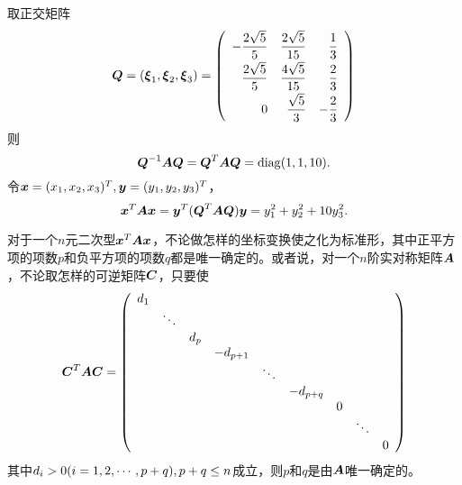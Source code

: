 \begin{frame}
  
  取正交矩阵
  $$
  \boldsymbol{Q}=(\boldsymbol{\xi}_1,\boldsymbol{\xi}_2,\boldsymbol{\xi}_3)=\left(
    \begin{array}{rrr}
      \displaystyle-\frac{2\sqrt{5}}5&\displaystyle\frac{2\sqrt{5}}{15}&\displaystyle\frac13\\[0.2cm]
      \displaystyle \frac{2\sqrt{5}}5&\displaystyle\frac{4\sqrt{5}}{15}&\displaystyle\frac23\\[0.2cm]
      \displaystyle 0&\displaystyle\frac{\sqrt{5}}3&\displaystyle-\frac23
    \end{array}
  \right)
  $$
  则
  $$
  \boldsymbol{Q}^{-1}\boldsymbol{A}\boldsymbol{Q}=\boldsymbol{Q}^{T}\boldsymbol{A}\boldsymbol{Q}=\mathrm{diag}(1,1,10).
  $$ \pause 
  令${\boldsymbol{x}}=(x_1,x_2,x_3)^T,{\boldsymbol{y}}=(y_1,y_2,y_3)^T$，
  $$
  {\boldsymbol{x}}^T\boldsymbol{A}{\boldsymbol{x}}={\boldsymbol{y}}^T(\boldsymbol{Q}^T\boldsymbol{A}\boldsymbol{Q}){\boldsymbol{y}}=y_1^2+y_2^2+10y_3^2.
  $$
  
\end{frame}








\begin{frame}
  
  \begin{dingli}[惯性定理]
    对于一个$n$元二次型${\boldsymbol{x}}^T\boldsymbol{A}{\boldsymbol{x}}$，不论做怎样的坐标变换使之化为标准形，其中正平方项的项数$p$和负平方项的项数$q$都是唯一确定的。或者说，对一个$n$阶实对称矩阵$\boldsymbol{A}$，不论取怎样的可逆矩阵$\boldsymbol{C}$，只要使
    $$
    \boldsymbol{C}^T\boldsymbol{A}\boldsymbol{C}=\left(
      \begin{array}{cccccccccc}
        d_1&&&&&&&&\\
           &\ddots&&&&&&&\\
           &&d_p&&&&&&\\
           &&&-d_{p+1}&&&&&\\
           &&&&\ddots&&&&\\
           &&&&&-d_{p+q}&&&\\
           &&&&&&0&&\\
           &&&&&&&\ddots&\\
           &&&&&&&&0
      \end{array}
    \right)
    $$
    其中$d_i>0(i=1,2,\cdots,p+q),p+q\le n$成立，则$p$和$q$是由$\boldsymbol{A}$唯一确定的。
  \end{dingli}
  
\end{frame}



